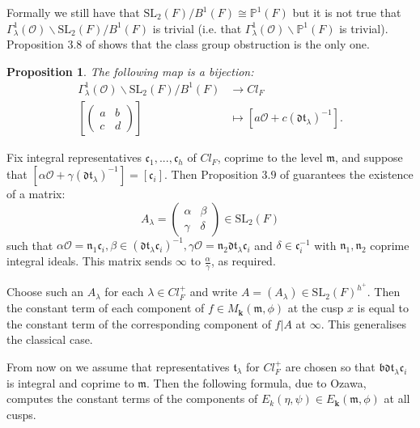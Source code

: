 \documentclass[a4paper,oneside]{amsart}
\theoremstyle{plain}
\newtheorem{prop}[thm]{Proposition}
\theoremstyle{definition}
\begin{document}
Formally we still have that $\text{SL}_2(F)/B^1(F) \cong \mathbb{P}^1(F)$ but it is not true that $\Gamma_{\lambda}^1(\mathcal{O})\backslash\text{SL}_2(F)/B^1(F)$ is trivial (i.e. that $\Gamma_{\lambda}^1(\mathcal{O})\backslash\mathbb{P}^1(F)$ is trivial). Proposition $3.8$ of \cite{ozawa} shows that the class group obstruction is the only one.

\begin{prop}
The following map is a bijection: \begin{align*}\Gamma_{\lambda}^1(\mathcal{O})\backslash\text{SL}_2(F)/B^1(F) &\longrightarrow Cl_F \\ \left[\left(\begin{array}{cc}a & b\\ c & d\end{array}\right)\right] &\longmapsto [a\mathcal{O}+c(\mathfrak{dt}_{\lambda})^{-1}].\end{align*}
\end{prop}

Fix integral representatives $\mathfrak{c}_1,...,\mathfrak{c}_{h}$ of $Cl_F$, coprime to the level $\mathfrak{m}$, and suppose that $[\alpha\mathcal{O}+\gamma(\mathfrak{dt}_{\lambda})^{-1}] = [\mathfrak{c}_i]$. Then Proposition $3.9$ of \cite{ozawa} guarantees the existence of a matrix: \[A_{\lambda} = \left(\begin{array}{cc}\alpha & \beta\\ \gamma & \delta\end{array}\right)\in\text{SL}_2(F)\] such that $\alpha\mathcal{O} = \mathfrak{n}_1\mathfrak{c}_i, \beta \in (\mathfrak{dt}_{\lambda}\mathfrak{c}_i)^{-1}, \gamma\mathcal{O} = \mathfrak{n}_2\mathfrak{dt}_{\lambda}\mathfrak{c}_i$ and $\delta\in\mathfrak{c}_i^{-1}$ with $\mathfrak{n}_1, \mathfrak{n}_2$ coprime integral ideals. This matrix sends $\infty$ to $\frac{\alpha}{\gamma}$, as required.

Choose such an $A_{\lambda}$ for each $\lambda\in Cl^{+}_F$ and write $A = (A_{\lambda})\in\text{SL}_2(F)^{h^{+}}$. Then the constant term of each component of $f\in M_{\textbf{k}}(\mathfrak{m},\phi)$ at the cusp $x$ is equal to the constant term of the corresponding component of $f|A$ at $\infty$. This generalises the classical case. 

From now on we assume that representatives $\mathfrak{t}_{\lambda}$ for $Cl_F^{+}$ are chosen so that $\mathfrak{bdt}_{\lambda}\mathfrak{c}_i$ is integral and coprime to $\mathfrak{m}$. Then the following formula, due to Ozawa, computes the constant terms of the components of $E_k(\eta,\psi)\in E_{\textbf{k}}(\mathfrak{m},\phi)$ at all cusps.
\end{document}
